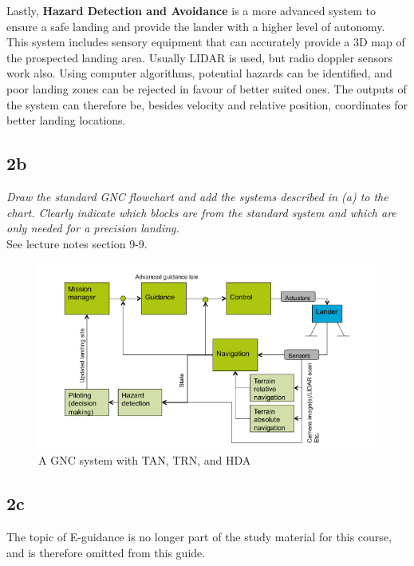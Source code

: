Lastly, \textbf{Hazard Detection and Avoidance} is a more advanced system to ensure a safe landing and provide the lander with a higher level of autonomy. This system includes sensory equipment that can accurately provide a 3D map of the prospected landing area. Usually LIDAR is used, but radio doppler sensors work also. Using computer algorithms, potential hazards can be identified, and poor landing zones can be rejected in favour of better suited ones. The outputs of the system can therefore be, besides velocity and relative position, coordinates for better landing locations.

\subsection{2b}
\textit{Draw the standard GNC flowchart and add the systems described in (a) to
the chart. Clearly indicate which blocks are from the standard system and which are only needed for a precision landing.}\\
See lecture notes section 9-9.
\begin{figure}[H]
    \centering
    \includegraphics[width=0.8\columnwidth]{Figures/GNCplus.PNG}
    \caption{A GNC system with TAN, TRN, and HDA}
    \label{fig:GNC}
\end{figure}


\subsection{2c}
The topic of E-guidance is no longer part of the study material for this course, and is therefore omitted from this guide.